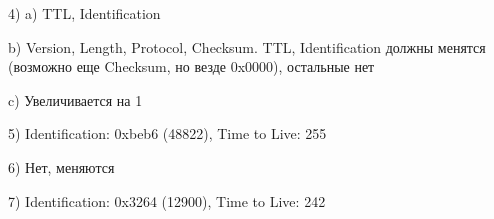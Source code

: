 \documentclass[a4paper,11pt]{article}
\begin{document}
\begin{center}
\label{fig:image}
\end{center}
4) a)  TTL, Identification

b) Version, Length, Protocol, Checksum. TTL, Identification должны менятся (возможно еще Checksum, но везде 0x0000), остальные нет

c) Увеличивается на 1

5) Identification: 0xbeb6 (48822), Time to Live: 255

6) Нет, меняются

\begin{center}
\label{fig:image}
\end{center}
7) Identification: 0x3264 (12900), Time to Live: 242
\end{document}
